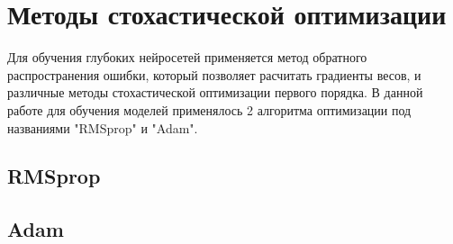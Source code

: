 \section{Методы стохастической оптимизации}
	Для обучения глубоких нейросетей применяется метод обратного распространения ошибки, который позволяет расчитать градиенты весов, и различные методы стохастической оптимизации первого порядка. В данной работе для обучения моделей применялось 2 алгоритма оптимизации под названиями "RMSprop" и "Adam".
	\subsection{RMSprop}
	\subsection{Adam}
	